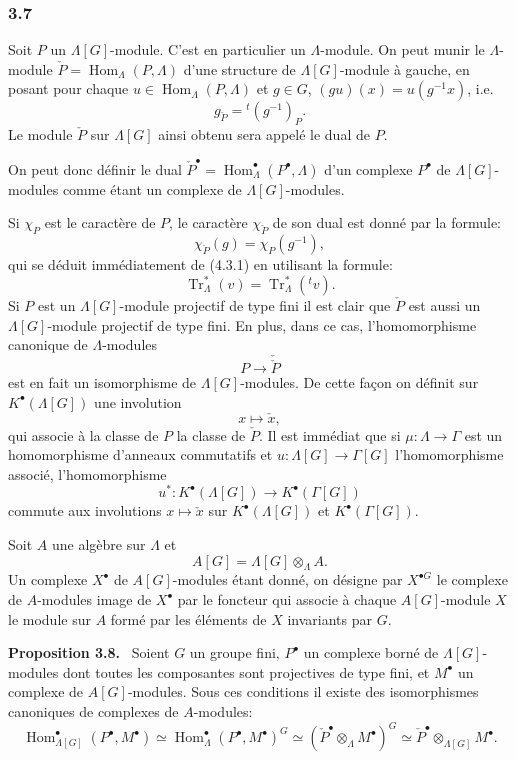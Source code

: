 \documentclass[11pt]{article}
\newenvironment{statement}[1]{\par\medskip\noindent\textbf{#1.}\ }{\par\medskip}
\DeclareMathOperator{\Hom}{Hom}
\providecommand{\Tr}{\operatorname{Tr}}
\providecommand{\Tr}{\operatorname{Tr}}
\providecommand{\Tr}{\operatorname{Tr}}
\providecommand{\Hom}{\operatorname{Hom}}
\providecommand{\Tr}{\operatorname{Tr}}
\providecommand{\Hom}{\operatorname{Hom}}
\providecommand{\Tr}{\operatorname{Tr}}
\begin{document}
\subsubsection*{3.7}

Soit $P$ un $\Lambda[G]$-module. C'est en particulier un $\Lambda$-module. On peut munir le $\Lambda$-module $\check P=\Hom_\Lambda(P,\Lambda)$ d'une structure de $\Lambda[G]$-module à gauche, en posant pour chaque $u\in\Hom_\Lambda(P,\Lambda)$ et $g\in G$, $(gu)(x)=u(g^{-1}x)$, i.e.
\[
g_{\check P}={}^{t}(g^{-1})_P.
\tag{3.7.1}
\]
Le module $\check P$ sur $\Lambda[G]$ ainsi obtenu sera appelé le dual de $P$.

On peut donc définir le dual $\check P^\bullet=\Hom_\Lambda^\bullet(P^\bullet,\Lambda)$ d'un complexe $P^\bullet$ de $\Lambda[G]$-modules comme étant un complexe de $\Lambda[G]$-modules.

Si $\chi_P$ est le caractère de $P$, le caractère $\chi_{\check P}$ de son dual est donné par la formule:
\[
\chi_{\check P}(g)=\chi_P(g^{-1}),
\tag{3.7.2}
\]
qui se déduit immédiatement de (4.3.1) en utilisant la formule:
\[
\Tr_\Lambda^*(v)=\Tr_\Lambda^*({}^{t}v).
\]
Si $P$ est un $\Lambda[G]$-module projectif de type fini il est clair que $\check P$ est aussi un $\Lambda[G]$-module projectif de type fini. En plus, dans ce cas, l'homomorphisme canonique de $\Lambda$-modules
\[
P\longrightarrow\check{\check P}
\]
est en fait un isomorphisme de $\Lambda[G]$-modules. De cette façon on définit sur $K^{\bullet}(\Lambda[G])$ une involution
\[
x\longmapsto \check x,
\]
qui associe à la classe de $P$ la classe de $\check P$. Il est immédiat que si $\mu:\Lambda\to\Gamma$ est un homomorphisme d'anneaux commutatifs et $u:\Lambda[G]\to\Gamma[G]$ l'homomorphisme associé, l'homomorphisme
\[
u^*:K^{\bullet}(\Lambda[G])\longrightarrow K^{\bullet}(\Gamma[G])
\]
commute aux involutions $x\longmapsto \check x$ sur $K^{\bullet}(\Lambda[G])$ et $K^{\bullet}(\Gamma[G])$.

Soit $A$ une algèbre sur $\Lambda$ et
\[
A[G]=\Lambda[G]\otimes_\Lambda A.
\]
Un complexe $X^\bullet$ de $A[G]$-modules étant donné, on désigne par $X^{\bullet G}$ le complexe de $A$-modules image de $X^\bullet$ par le foncteur qui associe à chaque $A[G]$-module $X$ le module sur $A$ formé par les éléments de $X$ invariants par $G$.

\begin{statement}{Proposition 3.8}
Soient $G$ un groupe fini, $P^\bullet$ un complexe borné de $\Lambda[G]$-modules dont toutes les composantes sont projectives de type fini, et $M^\bullet$ un complexe de $A[G]$-modules. Sous ces conditions il existe des isomorphismes canoniques de complexes de $A$-modules:
\[
\Hom_{\Lambda[G]}^\bullet(P^\bullet,M^\bullet)
\simeq \Hom_\Lambda^\bullet(P^\bullet,M^\bullet)^G
\simeq (\check P^\bullet\otimes_\Lambda M^\bullet)^G
\simeq \check P^\bullet\otimes_{\Lambda[G]}M^\bullet.
\tag{3.8.1}
\]
\end{statement}
\end{document}

